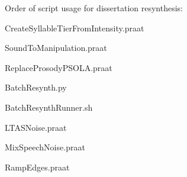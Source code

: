 Order of script usage for dissertation resynthesis:

CreateSyllableTierFromIntensity.praat

SoundToManipulation.praat

ReplaceProsodyPSOLA.praat

BatchResynth.py

BatchResynthRunner.sh

LTASNoise.praat

MixSpeechNoise.praat

RampEdges.praat
